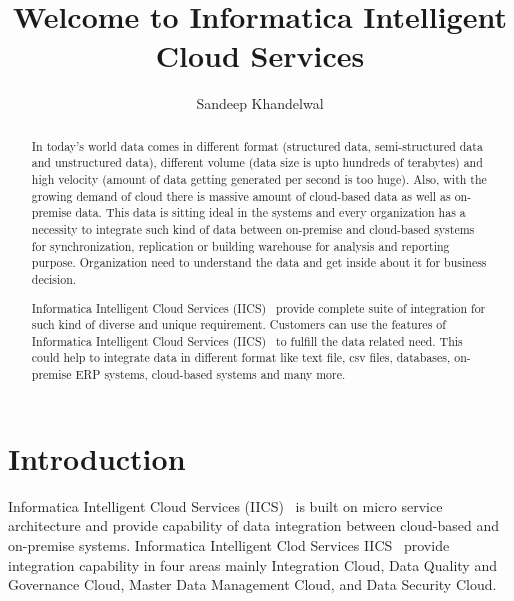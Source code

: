 
\title{Welcome to Informatica Intelligent Cloud Services}

\author{Sandeep Khandelwal}

\renewcommand{\shortauthors}{S. Khandelwal}

\begin{abstract}
	
In today's world data comes in different format (structured data,
semi-structured data and unstructured data), different volume (data
size is upto hundreds of terabytes) and high velocity (amount of data
getting generated per second is too huge). Also, with the growing
demand of cloud there is massive amount of cloud-based data as well as
on-premise data. This data is sitting ideal in the systems and every
organization has a necessity to integrate such kind of data between
on-premise and cloud-based systems for synchronization, replication or
building warehouse for analysis and reporting purpose. Organization
need to understand the data and get inside about it for business
decision.

Informatica Intelligent Cloud Services (IICS)~\cite{hid-sp18-511-iics}
provide complete suite of integration for such kind of diverse and
unique requirement. Customers can use the features of Informatica
Intelligent Cloud Services (IICS)~\cite{hid-sp18-511-iics} to fulfill
the data related need. This could help to integrate data in different
format like text file, csv files, databases, on-premise ERP systems,
cloud-based systems and many more.

\end{abstract}



\maketitle


\section{Introduction}

Informatica Intelligent Cloud Services (IICS)~\cite{hid-sp18-511-iics}
is built on micro service architecture and provide capability of data
integration between cloud-based and on-premise systems. Informatica
Intelligent Clod Services IICS~\cite{hid-sp18-511-iics} provide
integration capability in four areas mainly Integration Cloud, Data
Quality and Governance Cloud, Master Data Management Cloud, and Data
Security Cloud.

